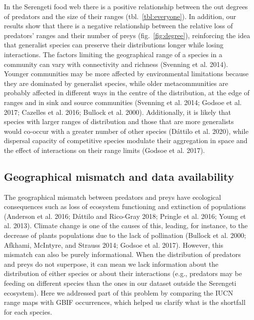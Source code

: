 \documentclass[10pt,oneside]{article}
\begin{document}
In the Serengeti food web there is a positive relationship between the
out degrees of predators and the size of their ranges
(tbl.~\ref{tbl:everyone}). In addition, our results show that there is a
negative relationship between the relative loss of predators' ranges and
their number of preys (fig.~\ref{fig:degree}), reinforcing the idea that
generalist species can preserve their distributions longer while losing
interactions. The factors limiting the geographical range of a species
in a community can vary with connectivity and richness (Svenning et al.
2014). Younger communities may be more affected by environmental
limitations because they are dominated by generalist species, while
older metacommunities are probably affected in different ways in the
centre of the distribution, at the edge of ranges and in sink and source
communities (Svenning et al. 2014; Godsoe et al. 2017; Cazelles et al.
2016; Bullock et al. 2000). Additionally, it is likely that species with
larger ranges of distribution and those that are more generalists would
co-occur with a greater number of other species (Dáttilo et al. 2020),
while dispersal capacity of competitive species modulate their
aggregation in space and the effect of interactions on their range
limits (Godsoe et al. 2017).

\hypertarget{geographical-mismatch-and-data-availability}{%
\subsection{Geographical mismatch and data
availability}\label{geographical-mismatch-and-data-availability}}

The geographical mismatch between predators and preys have ecological
consequences such as loss of ecosystem functioning and extinction of
populations (Anderson et al. 2016; Dáttilo and Rico-Gray 2018; Pringle
et al. 2016; Young et al. 2013). Climate change is one of the causes of
this, leading, for instance, to the decrease of plants populations due
to the lack of pollination (Bullock et al. 2000; Afkhami, McIntyre, and
Strauss 2014; Godsoe et al. 2017). However, this mismatch can also be
purely informational. When the distribution of predators and preys do
not superpose, it can mean we lack information about the distribution of
either species or about their interactions (e.g., predators may be
feeding on different species than the ones in our dataset outside the
Serengeti ecosystem). Here we addressed part of this problem by
comparing the IUCN range maps with GBIF occurrences, which helped us
clarify what is the shortfall for each species.
\end{document}
